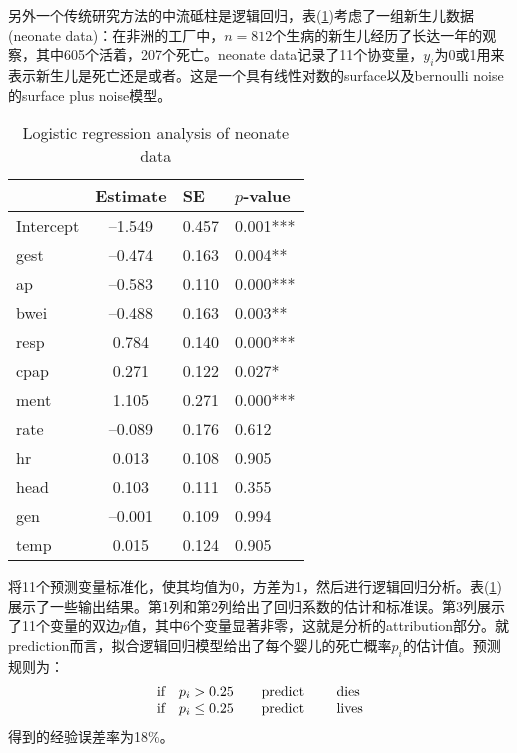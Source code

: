 \documentclass[lang=cn,11pt,a4paper,cite=authoryear]{elegantpaper}
\begin{document}
另外一个传统研究方法的中流砥柱是逻辑回归，表(\ref{table1})考虑了一组新生儿数据(neonate data)：在非洲的工厂中，$n=812$个生病的新生儿经历了长达一年的观察，其中605个活着，207个死亡。neonate data记录了11个协变量，$y_i$为0或1用来表示新生儿是死亡还是或者。这是一个具有线性对数的surface以及bernoulli noise的surface plus noise模型。
\begin{table}[H]
    \centering
    \caption{Logistic regression analysis of neonate data}
    \label{table1}
    \begin{tabular}{lcll}
    	\toprule
         & Estimate & SE & $p$-value \\ 
        \midrule
        Intercept & –1.549 & 0.457 & 0.001*** \\ 
        gest & –0.474 & 0.163 & 0.004** \\ 
        ap & –0.583 & 0.110 & 0.000*** \\ 
        bwei & –0.488 & 0.163 & 0.003** \\ 
        resp & 0.784 & 0.140 & 0.000*** \\ 
        cpap & 0.271 & 0.122 & 0.027* \\ 
        ment & 1.105 & 0.271 & 0.000*** \\ 
        rate & –0.089 & 0.176 & 0.612 \\ 
        hr & 0.013 & 0.108 & 0.905 \\ 
        head & 0.103 & 0.111 & 0.355 \\ 
        gen & –0.001 & 0.109 & 0.994 \\ 
        temp & 0.015 & 0.124 & 0.905 \\ 
        \bottomrule
    \end{tabular}
\end{table}

将11个预测变量标准化，使其均值为0，方差为1，然后进行逻辑回归分析。表(\ref{table1})展示了一些输出结果。第1列和第2列给出了回归系数的估计和标准误。第3列展示了11个变量的双边$p$值，其中6个变量显著非零，这就是分析的attribution部分。就prediction而言，拟合逻辑回归模型给出了每个婴儿的死亡概率$p_i$的估计值。预测规则为：
\begin{align}
\begin{array}{l}
\text{if}\quad p_i > 0.25 \qquad \text{predict \qquad dies} \\
\text{if}\quad p_i \leq 0.25 \qquad \text{predict \qquad lives}
\end{array}
\end{align}
得到的经验误差率为18\%。
\end{document}
